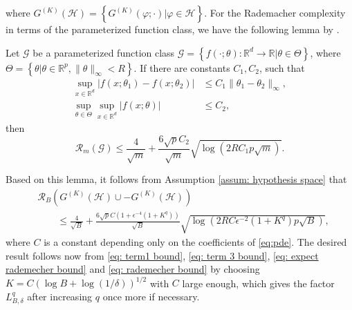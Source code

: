 \documentclass[twoside,11pt]{article}
\newcommand{\R}{\mathbb{R}}
\newcommand{\cH}{\mathcal{H}}
\newcommand{\1}{\mathbf{1}}
\numberwithin{equation}{section}
\begin{document}
where $ G^{(K)}(\cH) = \left\{ G^{(K)}(\varphi;\cdot)| \varphi \in \cH\right\}$. For the Rademacher complexity in terms of the parameterized function class, we have the following lemma by \cite{jiao2024error}.
\begin{lemma}
    Let $ \mathcal{G}$ be a parameterized function class $ \mathcal{G} = \left\{ f(\cdot;\theta): \R^d\rightarrow \R|\theta \in \Theta\right\}$, where $ \Theta = \left\{ \theta| \theta \in \R^p, \|\theta\|_{\infty}< R\right\}$. If there are constants $ C_1, C_2$, such that
    \begin{equation}
        \begin{aligned}
            \sup_{x\in \R^d} |f(x;\theta_1) - f(x;\theta_2)| &\le C_1 \|\theta_1 - \theta_2\|_{\infty},\\
            \sup_{\theta \in \Theta}\sup_{x\in \R^d}|f(x;\theta)| &\le C_2,
        \end{aligned}
    \end{equation}
    then
    \begin{equation}
        \mathcal{R}_m(\mathcal{G}) \le \frac{4}{\sqrt{m}} + \frac{6\sqrt{p}C_2}{\sqrt{m}}\sqrt{\log(2RC_1p\sqrt{m})}.
    \end{equation}
\end{lemma}

Based on this lemma, it follows from Assumption \ref{assum: hypothesis space} that
\begin{equation}\label{eq: rademecher bound}
\begin{aligned}
    &\mathcal{R}_B(G^{(K)}(\cH) \cup -G^{(K)}(\cH)) \\
    &\qquad\le \frac{4}{\sqrt{B}} + \frac{6\sqrt{p}C(1 + \epsilon^{-4}(1+K^{q}))}{\sqrt{B}}\sqrt{\log(2RC\epsilon^{-2}(1+K^{q})p\sqrt{B})},
    \end{aligned}
\end{equation}
where $ C$ is a constant depending only on the coefficients of \eqref{eq:pde}. 
The desired result follows now from \eqref{eq: term1 bound},  \eqref{eq: term 3 bound}, \eqref{eq: expect rademecher bound} and \eqref{eq: rademecher bound} by choosing $ K = C(\log B + \log (1/\delta))^{1/2}$ with $C$ large enough, which gives the factor $L_{B,\delta}^{q}$ after increasing $q$ once more if necessary.
\end{document}
